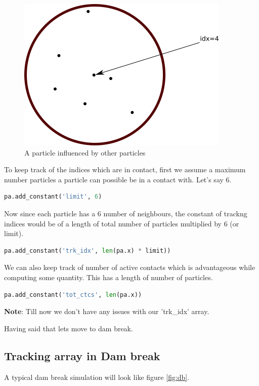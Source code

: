 \begin{figure}[H]
\centering
\includegraphics[scale=1]{figures/ed_zoom.png}
\caption{A particle influenced by other particles\label{fig:par_trk_idxs}}
\end{figure}

To keep track of the indices which are in contact, first we assume a maximum
number particles a particle can possible be in a contact with. Let's say 6.

\begin{lstlisting}[language=Python]
     pa.add_constant('limit', 6)
\end{lstlisting}

Now since each particle has a 6 number of neighbours, the constant of trackng
indices would be of a length of total number of particles multiplied by 6 (or
limit).

\begin{lstlisting}[language=Python]
     pa.add_constant('trk_idx', len(pa.x) * limit))
\end{lstlisting}

We can also keep track of number of active contacts which is advantageous
while computing some quantity. This has a length of number of particles.

\begin{lstlisting}[language=Python]
     pa.add_constant('tot_ctcs', len(pa.x))
\end{lstlisting}

\textbf{Note}: Till now we don't have any issues with our 'trk\_idx' array.

Having said that lets move to dam break.

\subsection{Tracking array in Dam break}
\label{sec-3-2}
A typical dam break simulation will look like figure \ref{fig:db}.

